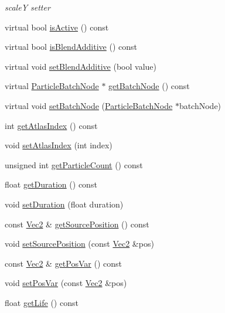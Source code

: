 \begin{DoxyCompactItemize}
\begin{DoxyCompactList}\small\item\em scaleY setter \end{DoxyCompactList}\item 
virtual bool \hyperlink{classParticleSystem_a2304b930424d5a65d96b1c1b3bf22873}{is\+Active} () const
\item 
virtual bool \hyperlink{classParticleSystem_a8d4f177ef491130b85b55766326d9bee}{is\+Blend\+Additive} () const
\item 
virtual void \hyperlink{classParticleSystem_abc8de72bc70a7c741c493607998ea2be}{set\+Blend\+Additive} (bool value)
\item 
virtual \hyperlink{classParticleBatchNode}{Particle\+Batch\+Node} $\ast$ \hyperlink{classParticleSystem_abc0ded8f688e32e0eaeb296bf07e05ac}{get\+Batch\+Node} () const
\item 
virtual void \hyperlink{classParticleSystem_a7758a2ae122f4fb48568412c3ce75146}{set\+Batch\+Node} (\hyperlink{classParticleBatchNode}{Particle\+Batch\+Node} $\ast$batch\+Node)
\item 
int \hyperlink{classParticleSystem_a43c52380c9e8caaaf1440758a35eec72}{get\+Atlas\+Index} () const
\item 
void \hyperlink{classParticleSystem_ae6e384f788e8bcb76ae4082b0f329cee}{set\+Atlas\+Index} (int index)
\item 
unsigned int \hyperlink{classParticleSystem_a730a00168ae2f5df5fe41b0b6681609b}{get\+Particle\+Count} () const
\item 
float \hyperlink{classParticleSystem_a6d8eb072c8670ee64381e6dbdb691070}{get\+Duration} () const
\item 
void \hyperlink{classParticleSystem_ab19b5936cb1d031282c0b6019ae4c60d}{set\+Duration} (float duration)
\item 
const \hyperlink{classVec2}{Vec2} \& \hyperlink{classParticleSystem_a61545eb1a87b37e75981c5954b0a9546}{get\+Source\+Position} () const
\item 
void \hyperlink{classParticleSystem_a531acedca857579ae8228e2b4c38a978}{set\+Source\+Position} (const \hyperlink{classVec2}{Vec2} \&pos)
\item 
const \hyperlink{classVec2}{Vec2} \& \hyperlink{classParticleSystem_a8c2d579f46f0f6bb70a604503ad68fba}{get\+Pos\+Var} () const
\item 
void \hyperlink{classParticleSystem_aefe6eeaede73513fec84e21d1efbcb04}{set\+Pos\+Var} (const \hyperlink{classVec2}{Vec2} \&pos)
\item 
float \hyperlink{classParticleSystem_a81ac82a5e755de1d33cb3e3521a8f0bd}{get\+Life} () const

\end{DoxyCompactItemize}
